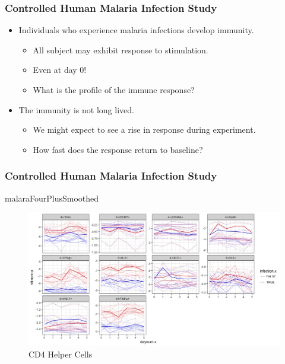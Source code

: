 \documentclass{beamer}
\theoremstyle{definition}
\begin{document}

\begin{frame}
\frametitle{Controlled Human Malaria Infection Study}
\begin{itemize}
\item  Individuals  who  experience malaria  infections develop  immunity.
	\begin{itemize}
	\item All subject may exhibit response to stimulation.
	\item Even at day 0!
	\item What is the profile of the immune response?
	\end{itemize}
	
\pause
\vspace{0.5 cm}
\item The  immunity is not long lived.
	\begin{itemize}
	\item We might expect to see a rise in response during experiment.
	\item How fast does the response return to baseline?
	\end{itemize}
\end{itemize}
\end{frame}


\begin{frame}
\frametitle{Controlled Human Malaria Infection Study}
malaraFourPlusSmoothed
\begin{figure}[]
\includegraphics[width=12 cm]{figures/fourPlusSmoothedNarrow} \caption{CD4 Helper Cells}
\end{figure}
\end{frame}

\end{document}
